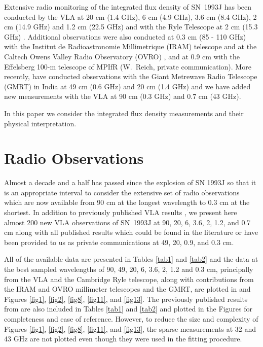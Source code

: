 \documentclass[12pt,preprint]{aastex}
\begin{document}
Extensive radio monitoring of the integrated flux density of SN~1993J
has been conducted by the VLA at 20 cm (1.4 GHz), 6 cm (4.9 GHz), 3.6 cm
(8.4 GHz), 2 cm (14.9 GHz) and 1.2 cm (22.5 GHz) \citep{VanDyk94} and
with the Ryle Telescope at 2 cm (15.3 GHz) \citep{Pooley93b}. 
Additional observations were also conducted at 0.3 cm (85 - 110 GHz)
with the Institut de Radioastronomie Millimetrique (IRAM) telescope \citep{Radford93} and at the
Caltech Owens Valley Radio Observatory (OVRO)
\citep{Phillips93a,Phillips93b}, and at 0.9 cm with the Effelsberg 100-m
telescope of MPIfR (W.~Reich, private communication).  More recently,
\citet{Chandra01} have conducted observations with the Giant Metrewave Radio Telescope (GMRT) in India at 49 cm
(0.6 GHz) and 20 cm (1.4 GHz) and we have added new measurements with
the VLA at 90 cm (0.3 GHz) and 0.7 cm (43 GHz).  

In this paper we consider the integrated flux density measurements and
their physical interpretation.

\section{Radio Observations}\label{observations}

Almost a decade and a half has passed since the explosion of SN 1993J so
that it is an appropriate interval to consider the extensive set of
radio observations which are now available from 90 cm at the longest
wavelength to 0.3 cm at the shortest.  In addition to previously
published VLA results \citep{VanDyk94}, we present here almost 200 new
VLA observations of SN~1993J at 90, 20, 6, 3.6, 2, 1.2, and 0.7 cm along
with all published results which could be found in the literature or
have been provided to us as private communications at 49, 20, 0.9, and 0.3
cm.  

All of the available data are presented in Tables \ref{tab1} and
\ref{tab2} and the data at the best sampled wavelengths of 90, 49, 20,
6, 3.6, 2, 1.2 and 0.3 cm, principally from the VLA and the Cambridge
Ryle telescope, along with contributions from the IRAM and OVRO millimeter telescopes and the GMRT, are plotted in and Figures \ref{fig1}, \ref{fig2}, \ref{fig8}, \ref{fig11}, and \ref{fig13}.  The previously published results from \citet{VanDyk94} are also included in Tables \ref{tab1} and \ref{tab2} and plotted in the Figures for completeness and ease of reference.  However, to reduce the size and complexity of Figures \ref{fig1}, \ref{fig2}, \ref{fig8}, \ref{fig11}, and \ref{fig13}, the sparse measurements at 32 and 43 GHz are not plotted
even though they were used in the fitting procedure.
\end{document}
